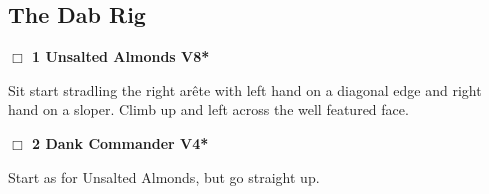 	\begin{multicols}{2}

\needspace{10em}
\subsection*{The Dab Rig}\label{bf:The Dab Rig}




\needspace{2em}
\label{rt:Unsalted Almonds}
\colorbox{Goldenrod!20}{
\parbox{0.95\linewidth}{
\hspace{-1ex}\textbf{$\Box$
1 Unsalted Almonds V8*  
}}}
\begin{adjustwidth}{1.3em}{}			

Sit start stradling the right arête with left hand on a diagonal edge and right hand on a sloper. Climb up and left across the well featured face.
\end{adjustwidth}




\needspace{2em}
\label{rt:Dank Commander}
\colorbox{RoyalBlue!20}{
\parbox{0.95\linewidth}{
\hspace{-1ex}\textbf{$\Box$
2 Dank Commander V4*  
}}}
\begin{adjustwidth}{1.3em}{}			

Start as for Unsalted Almonds, but go straight up.
\end{adjustwidth}






\end{multicols}
\clearpage